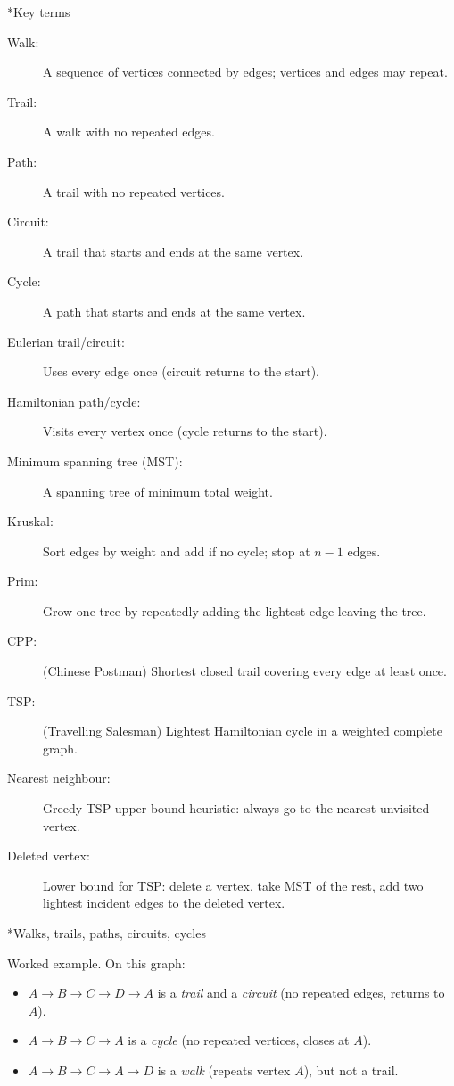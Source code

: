 \documentclass[11pt]{article}
\def\textbf#1{#1}%
\begin{document}
\textbf*{Key terms}
\begin{description}
  \item[Walk:] A sequence of vertices connected by edges; vertices and edges may repeat.
  \item[Trail:] A walk with no repeated edges.
  \item[Path:] A trail with no repeated vertices.
  \item[Circuit:] A trail that starts and ends at the same vertex.
  \item[Cycle:] A path that starts and ends at the same vertex.
  \item[Eulerian trail/circuit:] Uses every edge once (circuit returns to the start).
  \item[Hamiltonian path/cycle:] Visits every vertex once (cycle returns to the start).
  \item[Minimum spanning tree (MST):] A spanning tree of minimum total weight.
  \item[Kruskal:] Sort edges by weight and add if no cycle; stop at $n-1$ edges.
  \item[Prim:] Grow one tree by repeatedly adding the lightest edge leaving the tree.
  \item[CPP:] (Chinese Postman) Shortest closed trail covering every edge at least once.
  \item[TSP:] (Travelling Salesman) Lightest Hamiltonian cycle in a weighted complete graph.
  \item[Nearest neighbour:] Greedy TSP upper-bound heuristic: always go to the nearest unvisited vertex.
  \item[Deleted vertex:] Lower bound for TSP: delete a vertex, take MST of the rest, add two lightest incident edges to the deleted vertex.
\end{description}

\textbf*{Walks, trails, paths, circuits, cycles}
\begin{center}

\par\small\textbf{Worked example.}
On this graph:
\begin{itemize}\setlength{\itemsep}{1pt}
  \item $A\!\to\!B\!\to\!C\!\to\!D\!\to\!A$ is a \emph{trail} and a \emph{circuit} (no repeated edges, returns to $A$).
  \item $A\!\to\!B\!\to\!C\!\to\!A$ is a \emph{cycle} (no repeated vertices, closes at $A$).
  \item $A\!\to\!B\!\to\!C\!\to\!A\!\to\!D$ is a \emph{walk} (repeats vertex $A$), but not a trail.
\end{itemize}
\end{center}
\end{document}

